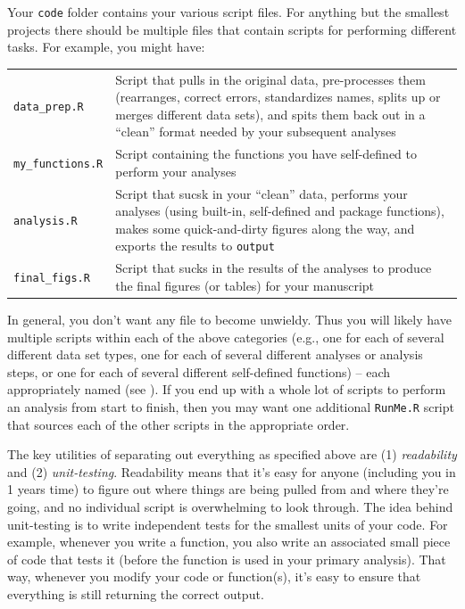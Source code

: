 \documentclass[12pt,letterpaper]{article}
\begin{document}
Your \texttt{code} folder contains your various script files.  For anything but the smallest projects there should be multiple files that contain scripts for performing different tasks.  For example, you might have: 

\begin{tabular}{p{0.2\linewidth}p{0.8\linewidth}}
	\texttt{data\_prep.R} & Script that pulls in the original data, pre-processes them (rearranges, correct errors, standardizes names, splits up or merges different data sets), and spits them back out in a ``clean'' format needed by your subsequent analyses \\
	\texttt{my\_functions.R} & Script containing the functions you have self-defined to perform your analyses \\
	\texttt{analysis.R} & Script that sucsk in your ``clean'' data, performs your analyses (using built-in, self-defined and package functions), makes some quick-and-dirty figures along the way, and exports the results to \texttt{output} \\
	\texttt{final\_figs.R} & Script that sucks in the results of the analyses to produce the final figures (or tables) for your manuscript\\

\end{tabular}

In general, you don't want any file to become unwieldy.  Thus you will likely have multiple scripts within each of the above categories (e.g., one for each of several different data set types, one for each of several different analyses or analysis steps, or one for each of several different self-defined functions) -- each appropriately named (see ).  If you end up with a whole lot of scripts to perform an analysis from start to finish, then you may want one additional \texttt{RunMe.R} script that sources each of the other scripts in the appropriate order.


The key utilities of separating out everything as specified above are (1) \emph{readability} and (2) \emph{unit-testing}.    Readability means that it's easy for anyone (including you in 1 years time) to figure out where things are being pulled from and where they're going, and no individual script is overwhelming to look through.  The idea behind unit-testing is to write independent tests for the smallest units of your code.  For example, whenever you write a function, you also write an associated small piece of code that tests it (before the function is used in your primary analysis). That way, whenever you modify your code or function(s), it's easy to ensure that everything is still returning the correct output.
\end{document}

